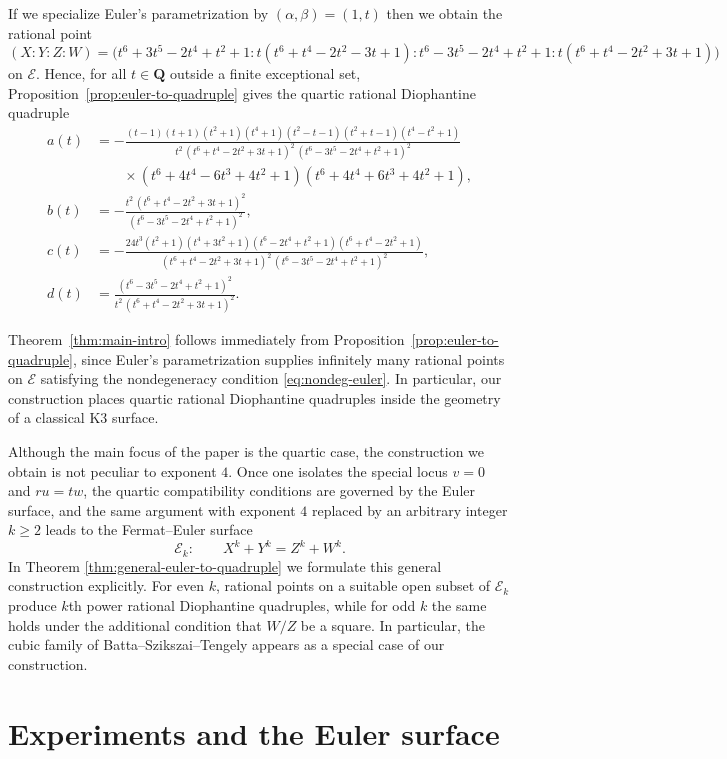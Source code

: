 \documentclass[11pt]{article}
\newcommand{\Q}{\mathbf{Q}}
\newcommand{\Eul}{\mathcal{E}}
\begin{document}
If we specialize Euler's parametrization by $(\alpha,\beta)=(1,t)$ then we obtain the rational point
\[
(X:Y:Z:W)=\bigl(
t^6+3t^5-2t^4+t^2+1:
t(t^6+t^4-2t^2-3t+1):
t^6-3t^5-2t^4+t^2+1:
t(t^6+t^4-2t^2+3t+1)
\bigr)
\]
on \(\Eul\). Hence, for all \(t\in\Q\) outside a finite exceptional set,
Proposition~\ref{prop:euler-to-quadruple} gives the quartic rational
Diophantine quadruple
\[
\begin{aligned}
a(t)&=
-\frac{(t-1)(t+1)(t^2+1)(t^4+1)(t^2-t-1)(t^2+t-1)(t^4-t^2+1)}%
{t^2\,(t^6+t^4-2t^2+3t+1)^2\,(t^6-3t^5-2t^4+t^2+1)^2}\\
&\qquad\times
(t^6+4t^4-6t^3+4t^2+1)(t^6+4t^4+6t^3+4t^2+1),\\[1ex]
b(t)&=
-\frac{t^2\,(t^6+t^4-2t^2+3t+1)^2}{(t^6-3t^5-2t^4+t^2+1)^2},\\[1ex]
c(t)&=
-\frac{24t^3(t^2+1)(t^4+3t^2+1)(t^6-2t^4+t^2+1)(t^6+t^4-2t^2+1)}%
{(t^6+t^4-2t^2+3t+1)^2\,(t^6-3t^5-2t^4+t^2+1)^2},\\[1ex]
d(t)&=
\frac{(t^6-3t^5-2t^4+t^2+1)^2}{t^2\,(t^6+t^4-2t^2+3t+1)^2}.
\end{aligned}
\]


Theorem~\ref{thm:main-intro} follows immediately from Proposition~\ref{prop:euler-to-quadruple}, since Euler's parametrization supplies infinitely many rational points on $\Eul$ satisfying the nondegeneracy condition \eqref{eq:nondeg-euler}. In particular, our construction places quartic rational Diophantine quadruples inside the geometry of a classical K3 surface.

Although the main focus of the paper is the quartic case, the construction we obtain is not peculiar to exponent $4$. Once one isolates the special locus $v=0$ and $ru=tw$, the quartic compatibility conditions are governed by the Euler surface, and the same argument with exponent $4$ replaced by an arbitrary integer $k\geq 2$ leads to the Fermat--Euler surface
\[
\mathcal E_k:\qquad X^k+Y^k=Z^k+W^k.
\]
In Theorem \ref{thm:general-euler-to-quadruple} we formulate this general construction explicitly. For even $k$, rational points on a suitable open subset of $\mathcal E_k$ produce $k$th power rational Diophantine quadruples, while for odd $k$ the same holds under the additional condition that $W/Z$ be a square. In particular, the cubic family of Batta--Szikszai--Tengely appears as a special case of our construction.

\section{Experiments and the Euler surface}\label{sec:euler-surface}
\end{document}
